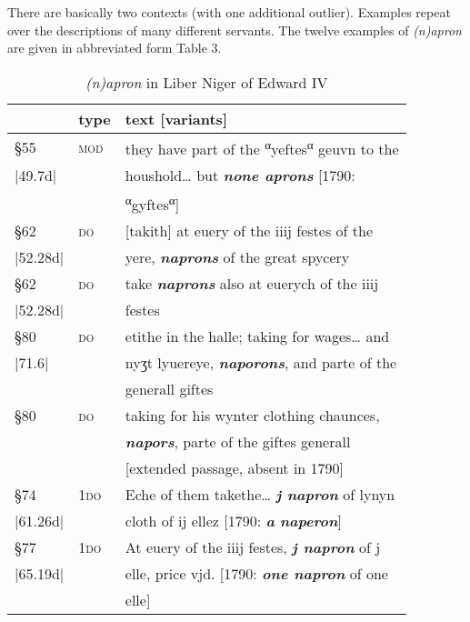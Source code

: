 \documentclass[output=paper,
modfonts
]{LSP/langsci}
\begin{document}
There are basically two contexts (with one additional outlier). Examples
repeat over the descriptions of many different servants. The twelve
examples of \emph{(n)apron} are given in abbreviated form Table 3.

\begin{table}[ht]
\centering\caption{\emph{(n)apron} in Liber Niger of Edward IV}
\begin{tabular}{lll}
\lsptoprule
& type & text {[}variants{]}\\
\midrule
§55	&	\textsc{mod}	&	they have part of the
\textsuperscript{α}yeftes\textsuperscript{α} geuvn to the  \\
|49.7d| & &  houshold\ldots{} but \textbf{\emph{none aprons}} {[}1790: \\
	 & & 	\textsuperscript{α}gyftes\textsuperscript{α}{]} \\

§62 &	\textsc{do}		&	{[}takith{]} at euery of the iiij festes of the \\
|52.28d| & & yere, \emph{\textbf{naprons}} of the great spycery \\

§62 & 	\textsc{do}		&	take \emph{\textbf{naprons}} also at euerych of the iiij \\
|52.28d| &	& festes \\

§80 &	\textsc{do}		&	etithe in the halle; taking for wages\ldots{} and \\
|71.6| & & nyʒt lyuereye, \emph{\textbf{naporons}}, and parte of the\\
	& & generall giftes \\

§80 & 	\textsc{do}		&	taking for his wynter clothing chaunces, \\
	& & \emph{\textbf{napors}}, parte of the giftes generall \\
	& &  {[}extended passage, absent in 1790{]}\\

§74 &	\textsc{1do}	&	 Eche of them takethe\ldots{} \emph{\textbf{j napron}} of lynyn \\
|61.26d| & & cloth of ij ellez {[}1790: \emph{\textbf{a} \textbf{naperon}}{]} \\

§77 &	\textsc{1do}	 &	At euery of the iiij festes, \emph{\textbf{j napron}} of j \\
|65.19d| & & elle, price vjd. {[}1790: \emph{\textbf{one napron}} of one\\
	& & 	elle{]}\\


\end{tabular}
\end{table}
\end{document}
